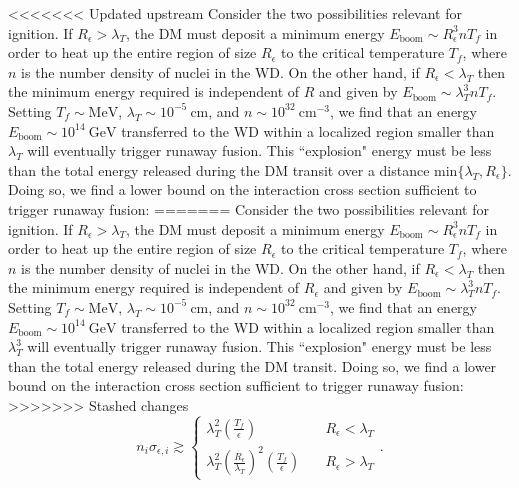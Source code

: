 \documentclass[twocolumn,showpacs,preprintnumbers,amsmath,amssymb,prl]{revtex4}
\def\r{\right)}
\def\l{\left(}
\begin{document}
<<<<<<< Updated upstream
Consider the two possibilities relevant for ignition. If $R_\epsilon> \lambda_T$, the DM must deposit a minimum energy $E_{\text{boom}} \sim R_\epsilon^3 n T_f$ in order to heat up the entire region of size $R_\epsilon$ to the critical temperature $T_f$, where $n$ is the number density of nuclei in the WD. On the other hand, if $R_\epsilon < \lambda_T$ then the minimum energy required is independent of $R$ and given by $E_{\text{boom}} \sim \lambda_T^3 n T_f$. Setting $T_f \sim \text{MeV}$, $\lambda_T \sim 10^{-5} ~\text{cm}$, and $n \sim 10^{32} ~\text{cm}^{-3}$, we find that an energy $E_{\text{boom}} \sim 10^{14} ~\text{GeV}$ transferred to the WD within a localized region smaller than $\lambda_T$ will eventually trigger runaway fusion. This ``explosion" energy must be less than the total energy released during the DM transit over a distance $\text{min}\{\lambda_T, R_\epsilon\}$. Doing so, we find a lower bound on the interaction cross section sufficient to trigger runaway fusion:
=======
Consider the two possibilities relevant for ignition. If $R_\epsilon> \lambda_T$, the DM must deposit a minimum energy $E_{\text{boom}} \sim R_\epsilon^3 n T_f$ in order to heat up the entire region of size $R_\epsilon$ to the critical temperature $T_f$, where $n$ is the number density of nuclei in the WD. On the other hand, if $R_\epsilon < \lambda_T$ then the minimum energy required is independent of $R_\epsilon$ and given by $E_{\text{boom}} \sim \lambda_T^3 n T_f$. Setting $T_f \sim \text{MeV}$, $\lambda_T \sim 10^{-5} ~\text{cm}$, and $n \sim 10^{32} ~\text{cm}^{-3}$, we find that an energy $E_{\text{boom}} \sim 10^{14} ~\text{GeV}$ transferred to the WD within a localized region smaller than $\lambda_T^3$ will eventually trigger runaway fusion. This ``explosion" energy must be less than the total energy released during the DM transit. Doing so, we find a lower bound on the interaction cross section sufficient to trigger runaway fusion: 
>>>>>>> Stashed changes
\begin{equation}
\label{eq:explosion}
n_i \sigma_{\epsilon,i} \gtrsim \left\{
        \begin{array}{ll}
            \displaystyle \lambda_T^2 \l \frac{T_f}{\epsilon} \r & \quad R_\epsilon < \lambda_T \\
             \lambda_T^2 \l \frac{R_\epsilon}{\lambda_T}\r^2 \l \frac{T_f}{\epsilon} \r & \quad R_\epsilon > \lambda_T
        \end{array}
    \right..
\end{equation}
\end{document}
